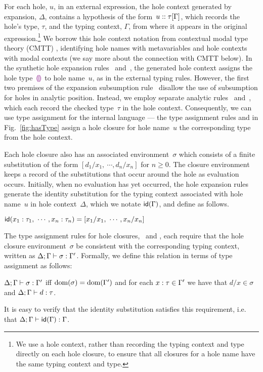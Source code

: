 %
For each hole, $u$, in an external expression, the hole context generated by expansion, $\Delta$, contains a hypothesis of the form~$u :: \tau[\Gamma]$, which records the hole's type, $\tau$, and the typing context, $\Gamma$, from where it appears in the original expression.\footnote{
We use a hole context, rather than recording the typing context and type directly on each hole closure, to ensure that all closures for a hole name have the same typing context and type.}
%
We borrow this hole context notation from contextual modal type theory (CMTT) \cite{Nanevski2008}, identifying hole names with metavariables and hole contexts with modal contexts (we say more about the connection with CMTT below).
%
%
In the synthetic hole expansion rules~ and~, the generated hole context assigns the hole type~$\textcolor{violet}{\llparenthesis}\textcolor{violet}{\rrparenthesis}$ to hole name~$u$, as in the external typing rules.
%
However, the first two premises of the expansion subsumption rule~ disallow the use of subsumption for holes in analytic position.
%
Instead, we employ separate analytic rules~ and~, which each record the checked type~$\tau$ in the hole context.
%
Consequently, we can use type assignment for the internal language --- the type assignment rules  and  in Fig.~\ref{fig:hasType} assign a hole closure for hole name~$u$ the corresponding type from the hole context.

Each hole closure also has an associated environment~$\sigma$ which consists of a finite substitution of the form $[d_1/x_1, ~\cdots, d_n/x_n]$ for $n \geq 0$.
%
The closure environment keeps a record of the substitutions that occur around the hole as evaluation occurs.
%
Initially, when no evaluation has yet occurred, the hole expansion rules generate the identity substitution for the typing context associated with hole name~$u$ in hole context~$\Delta$, which we notate $\mathsf{id}(\Gamma)$, and define as follows.
%
\begin{defn} $\mathsf{id}(x_1 : \tau_1, ~\cdots, x_n : \tau_n) = [x_1/x_1, ~\cdots, x_n/x_n]$
\end{defn}
\noindent
The type assignment rules for hole closures,~ and , each require that the hole closure environment~$\sigma$ be consistent with the corresponding typing context, written as $\Delta; \Gamma \vdash \sigma : \Gamma'$.
%
Formally, we define this relation in terms of type assignment as follows:
\begin{defn}
$\Delta; \Gamma \vdash \sigma : \Gamma'$ iff $\text{dom}(\sigma) = \text{dom}(\Gamma')$ and for each $x : \tau \in \Gamma'$ we have that $d/x \in \sigma$ and $\Delta; \Gamma \vdash d : \tau$.
\end{defn}
\noindent
It is easy to verify that the identity substitution satisfies this requirement, i.e. that $\Delta; \Gamma \vdash \mathsf{id}(\Gamma) : \Gamma$.

